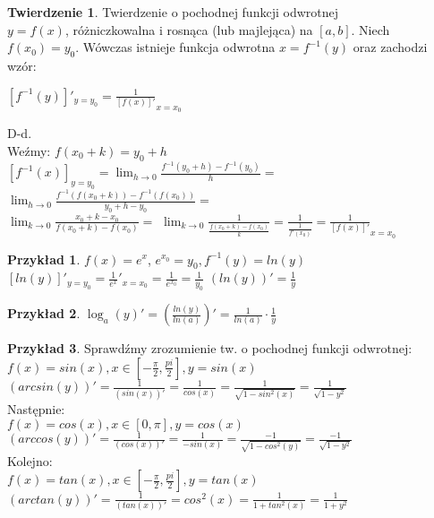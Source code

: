 \documentclass{article}
\theoremstyle{definition}
\theoremstyle{definition}
\newtheorem{tw}{Twierdzenie}[subsection]
\theoremstyle{definition}
\newtheorem{pk}{Przykład}[subsection]
\theoremstyle{definition}
\begin{document}
\begin{tw}
    Twierdzenie o pochodnej funkcji odwrotnej\\
    $y=f(x)$, różniczkowalna i rosnąca (lub majlejąca) na $[a,b]$.
    Niech $f(x_0)=y_0$. Wówczas istnieje funkcja odwrotna $x=f^{-1}(y)$
    oraz zachodzi wzór:
    \begin{center}
        $\left[f^{-1}(y)\right]'_{y=y_0} = \frac{1}{\left[f(x)\right]'}_{x=x_0}$
    \end{center}
\end{tw}
D-d.\\
Weźmy: $f(x_0 + k) = y_0 + h$\\
$\left[f^{-1}(x)\right]_{y=y_0}=\lim_{h\rightarrow 0} \frac{f^{-1}(y_0+h) - f^{-1}(y_0)}{h}=$
$\lim_{h\rightarrow 0} \frac{f^{-1}(f(x_0+k))-f^{-1}(f(x_0))}{y_0+h-y_0}=$\\
$\lim_{k\rightarrow 0} \frac{x_0 + k - x_0}{f(x_0 +k)-f(x_0)}=$
$\lim_{k\rightarrow 0} \frac{1}{\frac{f(x_0+k)-f(x_0)}{k}}=\frac{1}{\frac{1}{f'(x_0)}}=\frac{1}{\left[f(x)\right]'}_{x=x_0}$

\begin{pk}
    $f(x)=e^x$, $e^{x_0}=y_0, f^{-1}(y)=ln(y)$\\
    $\left[ln(y)\right]'_{y=y_0}=\frac{1}{e^x}'_{x=x_0} = \frac{1}{e^{x_0}} = \frac{1}{y_0}$
    $\left(ln(y)\right)' = \frac{1}{y}$
\end{pk}

\begin{pk}
    $\log_a(y)'=\left(\frac{ln(y)}{ln(a)}\right)'=\frac{1}{ln(a)} \cdot \frac{1}{y}$
\end{pk}

\begin{pk}
    Sprawdźmy zrozumienie tw. o pochodnej funkcji odwrotnej:\\
    $f(x)=sin(x), x\in[-\frac{\pi}{2},\frac{pi}{2}], y=sin(x)$\\
    $\left(arcsin(y)\right)'=\frac{1}{(sin(x))'} = \frac{1}{cos(x)}=\frac{1}{\sqrt{1-sin^2(x)}}=\frac{1}{\sqrt{1-y^2}}$\\
    Następnie:\\
    $f(x)=cos(x), x\in[0,\pi], y=cos(x)$\\
    $\left(arccos(y)\right)'=\frac{1}{(cos(x))'} = \frac{1}{-sin(x)} = \frac{-1}{\sqrt{1-cos^2(y)}}=\frac{-1}{\sqrt{1-y^2}}$\\
    Kolejno:\\
    $f(x)=tan(x), x\in[-\frac{\pi}{2},\frac{pi}{2}], y=tan(x)$\\
    $\left(arctan(y)\right)'=\frac{1}{(tan(x))'}=cos^2(x)=\frac{1}{1+tan^2(x)}=\frac{1}{1+y^2}$
\end{pk}
\end{document}
